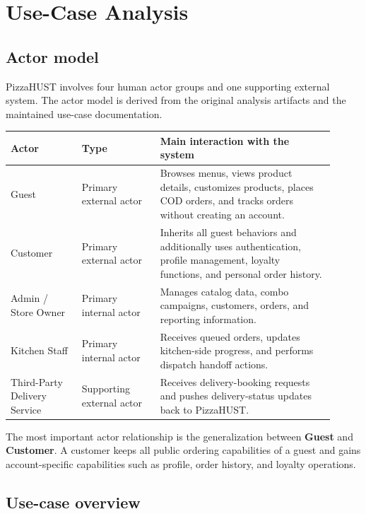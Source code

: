 \section{Use-Case Analysis}

\subsection{Actor model}

PizzaHUST involves four human actor groups and one supporting external system. The actor model is derived from the original analysis artifacts and the maintained use-case documentation.

\begingroup
\small
{}\label{tab:actor-model}
\begin{tabular}{L{0.20\linewidth} L{0.22\linewidth} L{0.49\linewidth}}
\toprule
\textbf{Actor} & \textbf{Type} & \textbf{Main interaction with the system} \\
\midrule
Guest & Primary external actor & Browses menus, views product details, customizes products, places COD orders, and tracks orders without creating an account. \\
Customer & Primary external actor & Inherits all guest behaviors and additionally uses authentication, profile management, loyalty functions, and personal order history. \\
Admin / Store Owner & Primary internal actor & Manages catalog data, combo campaigns, customers, orders, and reporting information. \\
Kitchen Staff & Primary internal actor & Receives queued orders, updates kitchen-side progress, and performs dispatch handoff actions. \\
Third-Party Delivery Service & Supporting external actor & Receives delivery-booking requests and pushes delivery-status updates back to PizzaHUST. \\
\bottomrule
\end{tabular}
\endgroup

The most important actor relationship is the generalization between \textbf{Guest} and \textbf{Customer}. A customer keeps all public ordering capabilities of a guest and gains account-specific capabilities such as profile, order history, and loyalty operations.

\subsection{Use-case overview}

